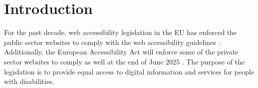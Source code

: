 \chapter{Introduction\label{intro}}

For the past decade, web accessibility legislation in the EU has enforced the public sector websites to comply with the web accessibility guidelines \citep{eudirective2016}. Additionally, the European Accessibility Act will enforce some of the private sector websites to comply as well at the end of June 2025 \citep{eudirective2019}. The purpose of the legislation is to provide equal access to digital information and services for people with disabilities.  
